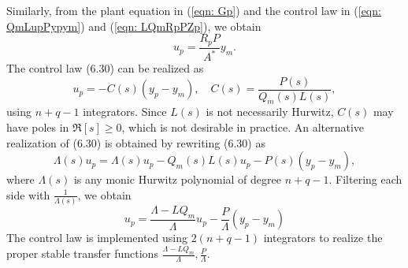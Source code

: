 \documentclass[10pt]{article}
\begin{document}
\begin{multicols*}{2}
Similarly, from the plant equation in (\ref{eqn: Gp}) and the control law in (\ref{eqn: QmLupPypym}) and (\ref{eqn: LQmRpPZp}), we obtain
\begin{equation}
	u_p=\frac{R_p P}{A^*} y_m .
\end{equation}
The control law (6.30) can be realized as
\begin{equation}
	u_p=-C(s)\left(y_p-y_m\right), \quad C(s)=\frac{P(s)}{Q_m(s) L(s)},
\end{equation}
using $n+q-1$ integrators. Since $L(s)$ is not necessarily Hurwitz, $C(s)$ may have poles in $\Re[s] \geq 0$, which is not desirable in practice. An alternative realization of (6.30) is obtained by rewriting (6.30) as
\begin{equation}
	\Lambda(s) u_p=\Lambda(s) u_p-Q_m(s) L(s) u_p-P(s)\left(y_p-y_m\right),
\end{equation}
where $\Lambda(s)$ is any monic Hurwitz polynomial of degree $n+q-1$. Filtering each side with $\frac{1}{\Lambda(s)}$, we obtain
\begin{equation}
	u_p=\frac{\Lambda-L Q_m}{\Lambda} u_p-\frac{P}{\Lambda}\left(y_p-y_m\right)
\end{equation}
The control law is implemented using $2(n+q-1)$ integrators to realize the proper stable transfer functions $\frac{\Lambda-L Q_m}{\Lambda}, \frac{P}{\Lambda}$.

\end{multicols*}
\end{document}
